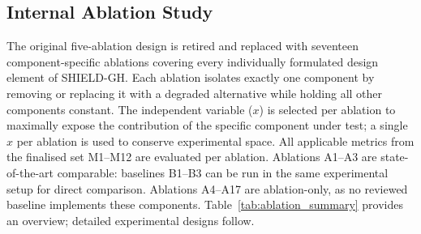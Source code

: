 \documentclass[12pt, a4paper]{report}
\begin{document}
\subsection{Internal Ablation Study}
\label{sec:ablation}

The original five-ablation design is retired and replaced with seventeen
component-specific ablations covering every individually formulated design
element of SHIELD-GH. Each ablation isolates exactly one component by
removing or replacing it with a degraded alternative while holding all
other components constant. The independent variable ($x$) is selected per
ablation to maximally expose the contribution of the specific component
under test; a single $x$ per ablation is used to conserve experimental
space. All applicable metrics from the finalised set M1--M12 are
evaluated per ablation. Ablations A1--A3 are state-of-the-art comparable:
baselines B1--B3 can be run in the same experimental setup for direct
comparison. Ablations A4--A17 are ablation-only, as no reviewed baseline
implements these components. Table~\ref{tab:ablation_summary} provides an
overview; detailed experimental designs follow.
\end{document}
